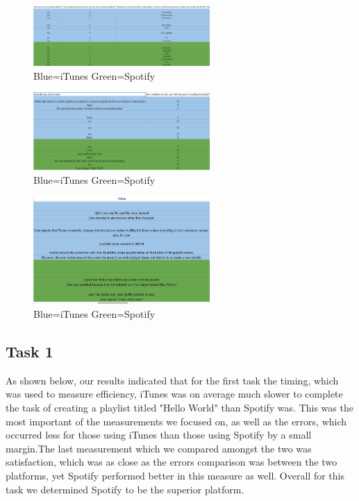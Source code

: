 \documentclass[a4paper]{article}
\begin{document}
\begin{figure}[H]
\centering
\includegraphics[width=0.6\textwidth]{tasks1.PNG}
\caption{\label{task:tasks1.1}Blue=iTunes  Green=Spotify}
\end{figure}
\begin{figure}[H]
\centering
\includegraphics[width=0.6\textwidth]{tasks2.PNG}
\caption{\label{task:tasks1.2}Blue=iTunes  Green=Spotify}
\end{figure}
\begin{figure}[H]
\centering
\includegraphics[width=0.6\textwidth]{tasks3.PNG}
\caption{\label{task:tasks1.3}Blue=iTunes  Green=Spotify}
\end{figure}

\subsection{Task 1}


As shown below, our results indicated that for the first task the timing, which was used to measure efficiency, iTunes was on average much slower to complete the task of creating a playlist titled "Hello World" than Spotify was. This was the most important of the measurements we focused on, as well as the errors, which occurred less for those using iTunes than those using Spotify by a small margin.The last measurement which we compared amongst the two was satisfaction, which was as close as the errors comparison was between the two platforms, yet Spotify performed better in this measure as well. Overall for this task we determined Spotify to be the superior platform. 
\end{document}
